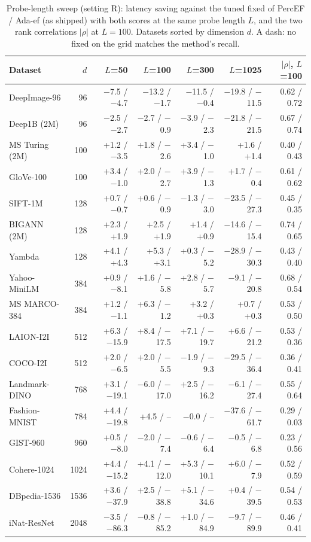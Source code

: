 \begin{table}[t]
  \caption{Probe-length sweep (setting R): latency saving against the tuned fixed \ef{} of PercEF / Ada-ef (as shipped) with both scores at the same probe length $L$, and the two rank correlations $|\rho|$ at $L = 100$. Datasets sorted by dimension $d$. A dash: no fixed \ef{} on the grid matches the method's recall.}
  \label{tab:vj-probes}
  \centering\footnotesize\setlength{\tabcolsep}{3.5pt}
  \begin{tabular}{lrrrrrr}
    \toprule
    Dataset & $d$ & $L$=50 & $L$=100 & $L$=300 & $L$=1025 & $|\rho|$, $L$=100 \\
    \midrule
    DeepImage-96 & 96 & $-$7.5 / $-$4.7 & $-$13.2 / $-$1.7 & $-$11.5 / $-$0.4 & $-$19.8 / $-$11.5 & 0.62 / 0.72 \\
    Deep1B (2M) & 96 & $-$2.5 / $-$2.7 & $-$2.7 / $-$0.9 & $-$3.9 / $-$2.3 & $-$21.8 / $-$21.5 & 0.67 / 0.74 \\
    MS Turing (2M) & 100 & +1.2 / $-$3.5 & +1.8 / $-$2.6 & +3.4 / $-$1.0 & +1.6 / +1.4 & 0.40 / 0.43 \\
    GloVe-100 & 100 & +3.4 / $-$1.0 & +2.0 / $-$2.7 & +3.9 / $-$1.3 & +1.7 / $-$0.4 & 0.61 / 0.62 \\
    SIFT-1M & 128 & +0.7 / $-$0.7 & +0.6 / $-$0.9 & $-$1.3 / $-$3.0 & $-$23.5 / $-$27.3 & 0.45 / 0.35 \\
    BIGANN (2M) & 128 & +2.3 / +1.9 & +2.5 / +1.9 & +1.4 / +0.9 & $-$14.6 / $-$15.4 & 0.74 / 0.65 \\
    Yambda & 128 & +4.1 / +4.3 & +5.3 / +3.1 & +0.3 / $-$5.2 & $-$28.9 / $-$30.3 & 0.43 / 0.40 \\
    Yahoo-MiniLM & 384 & +0.9 / $-$8.1 & +1.6 / $-$5.8 & +2.8 / $-$5.7 & $-$9.1 / $-$20.8 & 0.68 / 0.54 \\
    MS MARCO-384 & 384 & +1.2 / $-$1.1 & +6.3 / $-$1.2 & +3.2 / +0.3 & +0.7 / +0.3 & 0.53 / 0.50 \\
    LAION-I2I & 512 & +6.3 / $-$15.9 & +8.4 / $-$17.5 & +7.1 / $-$19.7 & +6.6 / $-$21.2 & 0.53 / 0.36 \\
    COCO-I2I & 512 & +2.0 / $-$6.5 & +2.0 / $-$5.5 & $-$1.9 / $-$9.3 & $-$29.5 / $-$36.4 & 0.36 / 0.41 \\
    Landmark-DINO & 768 & +3.1 / $-$19.1 & $-$6.0 / $-$17.0 & +2.5 / $-$16.2 & $-$6.1 / $-$27.4 & 0.55 / 0.64 \\
    Fashion-MNIST & 784 & +4.4 / $-$19.8 & +4.5 / -- & $-$0.0 / -- & $-$37.6 / $-$61.7 & 0.29 / 0.03 \\
    GIST-960 & 960 & +0.5 / $-$8.0 & $-$2.0 / $-$7.4 & $-$0.6 / $-$6.4 & $-$0.5 / $-$6.8 & 0.23 / 0.56 \\
    Cohere-1024 & 1024 & +4.4 / $-$15.2 & +4.1 / $-$12.0 & +5.3 / $-$10.1 & +6.0 / $-$7.9 & 0.52 / 0.59 \\
    DBpedia-1536 & 1536 & +3.6 / $-$37.9 & +2.5 / $-$38.8 & +5.1 / $-$34.6 & +0.4 / $-$39.5 & 0.54 / 0.53 \\
    iNat-ResNet & 2048 & $-$3.5 / $-$86.3 & $-$0.8 / $-$85.2 & +1.0 / $-$84.9 & $-$9.7 / $-$89.9 & 0.46 / 0.41 \\
    \bottomrule
  \end{tabular}
\end{table}

